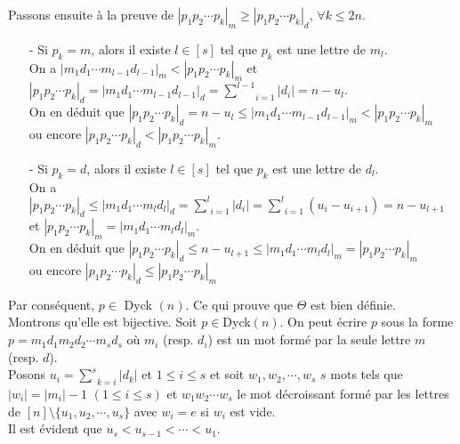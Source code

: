Passons ensuite à la preuve de $|p_{1}p_{2}\cdots p_{k}|_{m}\geq |p_{1}p_{2}\cdots p_{k}|_{d}$, $\forall k\leq 2n$.
\begin{itemize}
	\item [-] Si $p_{k}=m$, alors il existe $l\in [s]$ tel que $p_{k}$ est une lettre de $m_{l}$.\\ On a $|m_{1}d_{1}\cdots m_{l-1}d_{l-1}|_{m}<|p_{1}p_{2}\cdots p_{k}|_{m}$ et $|p_{1}p_{2}\cdots p_{k}|_{d}=|m_{1}d_{1}\cdots m_{l-1}d_{l-1}|_{d}=\underset{i=1}{\overset{l-1}{\sum}}|d_{i}|=n-u_{l}$.\\
	      On en déduit que $|p_{1}p_{2}\cdots p_{k}|_{d}=n-u_{l}\leq | m_{1}d_{1}\cdots m_{l-1}d_{l-1} |_{m} <|p_{1}p_{2}\cdots p_{k}|_{m}$ \\ ou encore $|p_{1}p_{2}\cdots p_{k}|_{d}<|p_{1}p_{2}\cdots p_{k}|_{m}$.

	\item [-] Si $p_{k}=d$, alors il existe $l\in[s]$ tel que $p_{k}$ est une lettre de $d_{l}$.\\ On a $|p_{1}p_{2}\cdots p_{k}|_{d}\leq |m_{1}d_{1}\cdots m_{l}d_{l}|_{d}=\underset{i=1}{\overset{l}{\sum}}|d_{i}|= \underset{i=1}{\overset{l}{\sum}}(u_{i}-u_{i+1})=n-u_{l+1}$ et $|p_{1}p_{2}\cdots p_{k}|_{m}=|m_{1}d_{1}\cdots m_{l}d_{l}|_{m}$.\\
	      On en déduit que $|p_{1}p_{2}\cdots p_{k}|_{d}\leq n-u_{l+1} \leq |m_{1}d_{1}\cdots m_{l}d_{l}|_{m} =|p_{1}p_{2}\cdots p_{k}|_{m}$ \\ou encore $|p_{1}p_{2}\cdots p_{k}|_{d} \leq|p_{1}p_{2}\cdots p_{k}|_{m}$\vspace{7pt}
\end{itemize}
Par conséquent, $p\in $\rm{ Dyck }$(n)$. Ce qui prouve que $\Theta$ est bien définie.\vspace{10pt}\\
Montrons qu'elle est bijective. Soit $p\in $\rm{Dyck}$(n)$. On peut écrire $p$ sous la forme $p=m_{1}d_{1}m_{2}d_{2}\cdots m_{s}d_{s}$ où $m_{i}$ (resp. $d_{i}$) est un mot formé par la seule lettre $m$ (resp. $d$).\\
Posons $u_{i}=\underset{k=i}{\overset{s}{\sum}}|d_{k}|$ et $1\leq i \leq s$ et soit $w_{1}, w_{2}, \cdots, w_{s}$ $s$ mots tels que $|w_{i}| = |m_{i}| - 1$ $(1\leq i \leq s)$ et $w_{1}w_{2}\cdots w_{s}$ le mot décroissant formé par les lettres de $[n]\setminus \{u_1, u_{2}, \cdots, u_{s}\}$ avec $w_i = e$ si $w_i$ est vide.\\
Il est évident que $u_s < u_{s-1}< \cdots < u_1$.\\
